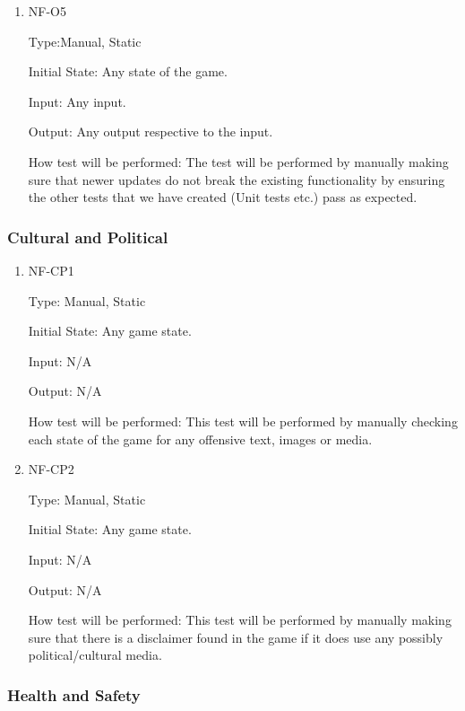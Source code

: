 \documentclass[12pt, titlepage]{article}
\begin{document}
\begin{enumerate}
\item{NF-O5\\}

Type:Manual, Static 
					
Initial State: Any state of the game.
					
Input: Any input. 
					
Output: Any output respective to the input.
					
How test will be performed: The test will be performed by manually making sure that newer updates do not break the existing functionality by ensuring the other tests that we have created (Unit tests etc.) pass as expected.

\end{enumerate}

\subsubsection{Cultural and Political}

\begin{enumerate}

\item{NF-CP1\\}

Type: Manual, Static
					
Initial State: Any game state.
					
Input: N/A 
					
Output: N/A 
					
How test will be performed: This test will be performed by manually checking each state of the game for any offensive text, images or media.

\item{NF-CP2\\}

Type: Manual, Static
					
Initial State: Any game state.
					
Input: N/A 
					
Output: N/A 
					
How test will be performed: This test will be performed by manually making sure that there is a disclaimer found in the game if it does use any possibly political/cultural media.

\end{enumerate}

\subsubsection{Health and Safety}
\end{document}
